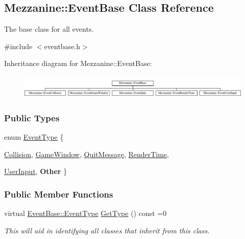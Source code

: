 \hypertarget{classMezzanine_1_1EventBase}{
\subsection{Mezzanine::EventBase Class Reference}
\label{classMezzanine_1_1EventBase}
}


The base class for all events.  




{\ttfamily \#include $<$eventbase.h$>$}

Inheritance diagram for Mezzanine::EventBase:\begin{figure}[H]
\begin{center}
\leavevmode
\includegraphics[height=1.148718cm]{classMezzanine_1_1EventBase}
\end{center}
\end{figure}
\subsubsection*{Public Types}
\begin{DoxyCompactItemize}
\item 
enum \hyperlink{classMezzanine_1_1EventBase_ab85e31e97753b7e7ecb098f82526baef}{EventType} \{ \par
\hyperlink{classMezzanine_1_1EventBase_ab85e31e97753b7e7ecb098f82526baefa43524066d608d6b89efed16d238049e9}{Collision}, 
\hyperlink{classMezzanine_1_1EventBase_ab85e31e97753b7e7ecb098f82526baefa90dad901adb5d77f267cd946a852b8c3}{GameWindow}, 
\hyperlink{classMezzanine_1_1EventBase_ab85e31e97753b7e7ecb098f82526baefae4ae51b0b870fc7229b52f636d30d19c}{QuitMessage}, 
\hyperlink{classMezzanine_1_1EventBase_ab85e31e97753b7e7ecb098f82526baefadd50d906767833b4676aa2cb2e232de2}{RenderTime}, 
\par
\hyperlink{classMezzanine_1_1EventBase_ab85e31e97753b7e7ecb098f82526baefacfd86eef72e950cce84662d8a1a121cd}{UserInput}, 
{\bfseries Other}
 \}
\end{DoxyCompactItemize}
\subsubsection*{Public Member Functions}
\begin{DoxyCompactItemize}
\item 
virtual \hyperlink{classMezzanine_1_1EventBase_ab85e31e97753b7e7ecb098f82526baef}{EventBase::EventType} \hyperlink{classMezzanine_1_1EventBase_aea900262a74d27e3b5df68a9deb18543}{GetType} () const =0
\begin{DoxyCompactList}\small\item\em This will aid in identifying all classes that inherit from this class. \item\end{DoxyCompactList}\end{DoxyCompactItemize}


